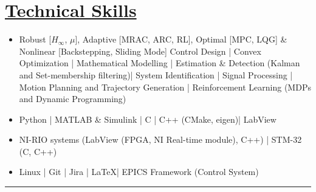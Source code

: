 \section*{\underline{Technical Skills}}
\begin{itemize}
        \item[\itbf{Control and Estimation:}] Robust [$H_\infty$, $\mu$], Adaptive [MRAC, ARC, RL], Optimal [MPC, LQG] \& Nonlinear [Backstepping, Sliding Mode] Control Design |
        Convex Optimization | Mathematical Modelling |
        Estimation \& Detection (Kalman and Set-membership filtering)|
        System Identification | Signal Processing |
        Motion Planning and Trajectory Generation |
        Reinforcement Learning (MDPs and Dynamic Programming)
        \item[\itbf{Programming:}] Python | MATLAB \& Simulink | C | C++ (CMake, eigen)| LabView
        \item[\itbf{Embedded Systems:}] NI-RIO systems (LabView (FPGA, NI Real-time module), C++) | STM-32 (C, C++)
        \item[\itbf{OS \& Tools:}] Linux | Git | Jira | \LaTeX | EPICS Framework (Control System)
\end{itemize}
\noindent\rule{\textwidth}{0.4pt}
